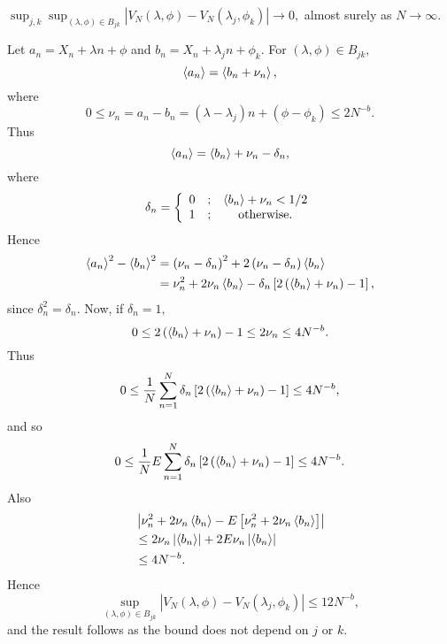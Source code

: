 \begin{lemma}
$\sup_{j,k}\sup_{\left(  \lambda,\phi\right)  \in B_{jk}}\left\vert
V_{N}\left(  \lambda,\phi\right)  -V_{N}\left(  \lambda_{j},\phi_{k}\right)
\right\vert \rightarrow0,$ almost surely as $N\rightarrow\infty.$
\end{lemma}

\begin{IEEEproof}
Let $a_n = X_{n}+\lambda n+\phi$ and $b_n = X_{n}+\lambda_{j}n+\phi
_{k}$. For $\left(  \lambda,\phi\right)  \in B_{jk},$%
\[
\left<   a_n  \right>  =\left<   b_n +\nu_{n}  \right>  ,
\]
where 
\[
0 \leq\nu_{n} = a_n - b_n = \left(  \lambda-\lambda_{j}\right)  n+\left(  \phi-\phi_{k}\right) \leq2N^{-b}.
\] 
Thus
\[
\left<   a_n  \right>  =\left<   b_n  \right>  +\nu_{n}-\delta_{n},
\]
where%
\[
\delta_{n}=\left\{
\begin{array}
[c]{ccc}%
0 & ; & \fracpart{  b_n }  +\nu_{n}<1/2\\
1 & ; & \text{otherwise.}%
\end{array}
\right.
\]
Hence%
\begin{align*}
\left<   a_n  \right>  ^{2}-\left<   b_n  \right>^{2}
& =\left(  \nu_{n}-\delta_{n}\right)  ^{2}+2\left(  \nu_{n}-\delta
_{n}\right)  \left<  b_n  \right> \\
& =\nu_{n}^{2}+2\nu_{n}\left<   b_n  \right>
-\delta_{n}\left[  2\left(  \left<   b_n  \right>
+\nu_{n}\right)  -1\right]  ,
\end{align*}
since $\delta_{n}^{2}=\delta_{n}.$ Now, if $\delta_{n}=1,$%
\[
0  \leq 2\left(  \left<   b_n  \right>  +\nu_{n}\right)  -1  \leq2\nu_{n} \leq 4N^{-b}.
\]
Thus%
\[
0 \leq\frac{1}{N}\sum_{n=1}^{N}\delta_{n}\left[  2\left(  \left< 
b_n  \right>  +\nu_{n}\right)  -1\right] \leq4N^{-b},
\]
and so%
\[
0  \leq\frac{1}{N}E\sum_{n=1}^{N}\delta_{n}\left[  2\left(  \left< 
b_n  \right>  +\nu_{n}\right)  -1\right] 
 \leq4N^{-b}.
\]
Also%
\begin{align*}
& \left\vert \nu_{n}^{2}+2\nu_{n}\left<   b_n  \right>  -E\left[  \nu_{n}^{2}+2\nu_{n}\left<   b_n  \right>  \right]  \right\vert \\
&  \leq2\nu_{n}\left\vert \left<   b_n  \right>
\right\vert +2E\nu_{n}\left\vert \left<   b_n  \right>
\right\vert \\
&  \leq4N^{-b}.
\end{align*}
Hence%
\[
\sup_{\left(  \lambda,\phi\right)  \in B_{jk}}\left\vert V_{N}\left(
\lambda,\phi\right)  -V_{N}\left(  \lambda_{j},\phi_{k}\right)  \right\vert
\leq12N^{-b},
\]
and the result follows as the bound does not depend on $j$ or $k$.
\end{IEEEproof}

